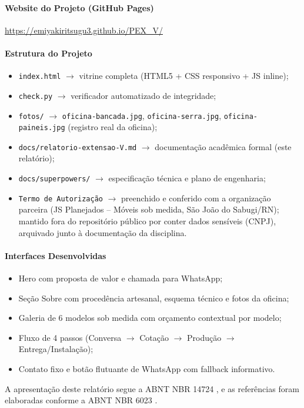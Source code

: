 \documentclass[12pt,a4paper]{article}
\begin{document}
\paragraph{Website do Projeto (GitHub Pages)}
\url{https://emiyakiritsugu3.github.io/PEX_V/}

\paragraph{Estrutura do Projeto}
\begin{itemize}[leftmargin=*]
\item \texttt{index.html} $\to$ vitrine completa (HTML5 + CSS responsivo + JS inline);
\item \texttt{check.py} $\to$ verificador automatizado de integridade;
\item \texttt{fotos/} $\to$ \texttt{oficina-bancada.jpg}, \texttt{oficina-serra.jpg}, \texttt{oficina-paineis.jpg} (registro real da oficina);
\item \texttt{docs/relatorio-extensao-V.md} $\to$ documentação acadêmica formal (este relatório);
\item \texttt{docs/superpowers/} $\to$ especificação técnica e plano de engenharia;
\item \texttt{Termo de Autorização} $\to$ preenchido e conferido com a organização parceira (JS Planejados -- Móveis sob medida, São João do Sabugi/RN); mantido fora do repositório público por conter dados sensíveis (CNPJ), arquivado junto à documentação da disciplina.
\end{itemize}

\paragraph{Interfaces Desenvolvidas}
\begin{itemize}[leftmargin=*]
\item Hero com proposta de valor e chamada para WhatsApp;
\item Seção Sobre com procedência artesanal, esquema técnico e fotos da oficina;
\item Galeria de 6 modelos sob medida com orçamento contextual por modelo;
\item Fluxo de 4 passos (Conversa $\to$ Cotação $\to$ Produção $\to$ Entrega/Instalação);
\item Contato fixo e botão flutuante de WhatsApp com fallback informativo.
\end{itemize}

A apresentação deste relatório segue a ABNT NBR 14724 \cite{abnt14724}, e as referências foram elaboradas conforme a ABNT NBR 6023 \cite{abnt6023}.
\end{document}
